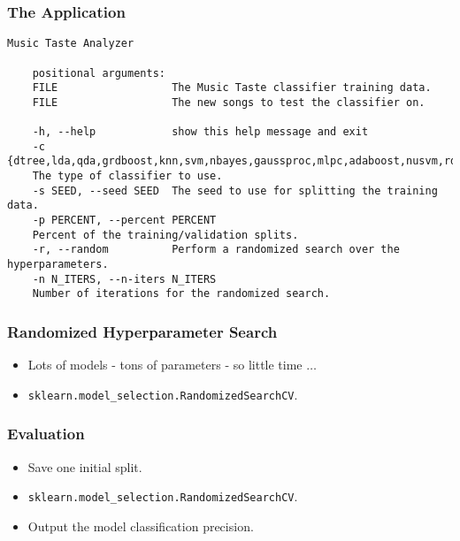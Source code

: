 \documentclass{beamer}
\begin{document}
\begin{frame}[fragile]
  \frametitle{The Application}

\begin{Verbatim}[fontsize=\footnotesize]
    Music Taste Analyzer

    positional arguments:
    FILE                  The Music Taste classifier training data.
    FILE                  The new songs to test the classifier on.

    -h, --help            show this help message and exit
    -c {dtree,lda,qda,grdboost,knn,svm,nbayes,gaussproc,mlpc,adaboost,nusvm,rdforest},
    The type of classifier to use.
    -s SEED, --seed SEED  The seed to use for splitting the training data.
    -p PERCENT, --percent PERCENT
    Percent of the training/validation splits.
    -r, --random          Perform a randomized search over the hyperparameters.
    -n N_ITERS, --n-iters N_ITERS
    Number of iterations for the randomized search.
\end{Verbatim}

\end{frame}


\begin{frame}
  \frametitle{Randomized Hyperparameter Search}

  \begin{itemize}
  \item Lots of models - tons of parameters - so little time $\ldots$
  \item \texttt{sklearn.model\_selection.RandomizedSearchCV}.
  \end{itemize}



\end{frame}


\begin{frame}
  \frametitle{Evaluation}

  \begin{itemize}
  \item Save one initial split.
  \item \texttt{sklearn.model\_selection.RandomizedSearchCV}.
  \item Output the model classification precision.
  \end{itemize}




\end{frame}
\end{document}
